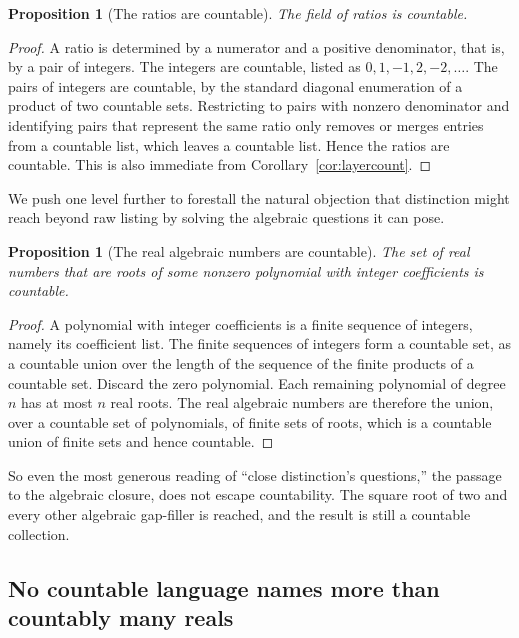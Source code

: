 \documentclass[11pt,a4paper]{article}
\newtheorem{proposition}[theorem]{Proposition}
\theoremstyle{definition}
\theoremstyle{remark}
\begin{document}
\begin{proposition}[The ratios are countable]\label{prop:qcount}
The field of ratios is countable.
\end{proposition}

\begin{proof}
A ratio is determined by a numerator and a positive denominator, that is, by a
pair of integers. The integers are countable, listed as $0, 1, -1, 2, -2, \dots$.
The pairs of integers are countable, by the standard diagonal enumeration of a
product of two countable sets. Restricting to pairs with nonzero denominator and
identifying pairs that represent the same ratio only removes or merges entries
from a countable list, which leaves a countable list. Hence the ratios are
countable. This is also immediate from Corollary~\ref{cor:layercount}.
\end{proof}

We push one level further to forestall the natural objection that distinction
might reach beyond raw listing by solving the algebraic questions it can pose.

\begin{proposition}[The real algebraic numbers are countable]\label{prop:algcount}
The set of real numbers that are roots of some nonzero polynomial with integer
coefficients is countable.
\end{proposition}

\begin{proof}
A polynomial with integer coefficients is a finite sequence of integers, namely
its coefficient list. The finite sequences of integers form a countable set, as a
countable union over the length of the sequence of the finite products of a
countable set. Discard the zero polynomial. Each remaining polynomial of degree
$n$ has at most $n$ real roots. The real algebraic numbers are therefore the
union, over a countable set of polynomials, of finite sets of roots, which is a
countable union of finite sets and hence countable.
\end{proof}

So even the most generous reading of ``close distinction's questions,'' the
passage to the algebraic closure, does not escape countability. The square root
of two and every other algebraic gap-filler is reached, and the result is still a
countable collection.

\subsection{No countable language names more than countably many reals}
\end{document}
